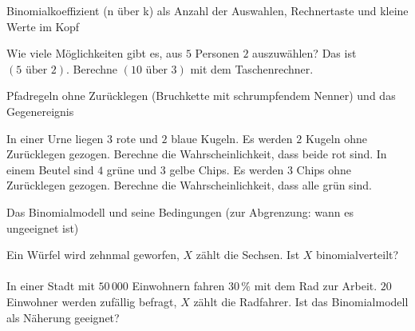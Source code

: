 \setcounter{aufgabe}{0}

\begin{aufgabe}{Binomialkoeffizient (n über k) als Anzahl der Auswahlen, Rechnertaste und kleine Werte im Kopf}
\begin{teile}
\teil Wie viele Möglichkeiten gibt es, aus $5$ Personen $2$ auszuwählen? Das ist $(5 \text{ über } 2)$.
\teil Berechne $(10 \text{ über } 3)$ mit dem Taschenrechner.
\end{teile}
\end{aufgabe}

\begin{aufgabe}{Pfadregeln ohne Zurücklegen (Bruchkette mit schrumpfendem Nenner) und das Gegenereignis}
\begin{teile}
\teil In einer Urne liegen $3$ rote und $2$ blaue Kugeln. Es werden $2$ Kugeln ohne Zurücklegen gezogen. Berechne die Wahrscheinlichkeit, dass beide rot sind.
\teil In einem Beutel sind $4$ grüne und $3$ gelbe Chips. Es werden $3$ Chips ohne Zurücklegen gezogen. Berechne die Wahrscheinlichkeit, dass alle grün sind.
\end{teile}
\end{aufgabe}

\begin{aufgabe}{Das Binomialmodell und seine Bedingungen (zur Abgrenzung: wann es ungeeignet ist)}
\begin{teile}
\teil Ein Würfel wird zehnmal geworfen, $X$ zählt die Sechsen. Ist $X$ binomialverteilt? \\  \\ 
\teil In einer Stadt mit $50\,000$ Einwohnern fahren $30\,\%$ mit dem Rad zur Arbeit. $20$ Einwohner werden zufällig befragt, $X$ zählt die Radfahrer. Ist das Binomialmodell als Näherung geeignet? \\  \\ 
\end{teile}
\end{aufgabe}

